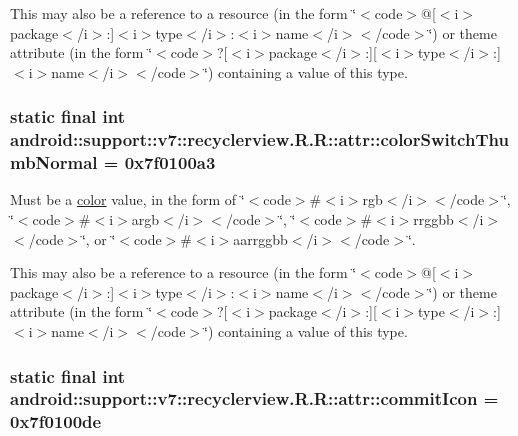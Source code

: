 This may also be a reference to a resource (in the form \char`\"{}$<$code$>$@\mbox{[}$<$i$>$package$<$/i$>$:\mbox{]}$<$i$>$type$<$/i$>$:$<$i$>$name$<$/i$>$$<$/code$>$\char`\"{}) or theme attribute (in the form \char`\"{}$<$code$>$?\mbox{[}$<$i$>$package$<$/i$>$:\mbox{]}\mbox{[}$<$i$>$type$<$/i$>$:\mbox{]}$<$i$>$name$<$/i$>$$<$/code$>$\char`\"{}) containing a value of this type. \hypertarget{classandroid_1_1support_1_1v7_1_1recyclerview_1_1_r_1_1attr_87d8c5adfd316a6c30182c5ca33fc1ab}{
\subsubsection[{colorSwitchThumbNormal}]{\setlength{\rightskip}{0pt plus 5cm}static final int android::support::v7::recyclerview.R.R::attr::colorSwitchThumbNormal = 0x7f0100a3}}
\label{classandroid_1_1support_1_1v7_1_1recyclerview_1_1_r_1_1attr_87d8c5adfd316a6c30182c5ca33fc1ab}


Must be a \hyperlink{classandroid_1_1support_1_1v7_1_1recyclerview_1_1_r_1_1color}{color} value, in the form of \char`\"{}$<$code$>$\#$<$i$>$rgb$<$/i$>$$<$/code$>$\char`\"{}, \char`\"{}$<$code$>$\#$<$i$>$argb$<$/i$>$$<$/code$>$\char`\"{}, \char`\"{}$<$code$>$\#$<$i$>$rrggbb$<$/i$>$$<$/code$>$\char`\"{}, or \char`\"{}$<$code$>$\#$<$i$>$aarrggbb$<$/i$>$$<$/code$>$\char`\"{}. 

This may also be a reference to a resource (in the form \char`\"{}$<$code$>$@\mbox{[}$<$i$>$package$<$/i$>$:\mbox{]}$<$i$>$type$<$/i$>$:$<$i$>$name$<$/i$>$$<$/code$>$\char`\"{}) or theme attribute (in the form \char`\"{}$<$code$>$?\mbox{[}$<$i$>$package$<$/i$>$:\mbox{]}\mbox{[}$<$i$>$type$<$/i$>$:\mbox{]}$<$i$>$name$<$/i$>$$<$/code$>$\char`\"{}) containing a value of this type. \hypertarget{classandroid_1_1support_1_1v7_1_1recyclerview_1_1_r_1_1attr_2e4f141299cff663f646011d5a430008}{
\subsubsection[{commitIcon}]{\setlength{\rightskip}{0pt plus 5cm}static final int android::support::v7::recyclerview.R.R::attr::commitIcon = 0x7f0100de}}
\label{classandroid_1_1support_1_1v7_1_1recyclerview_1_1_r_1_1attr_2e4f141299cff663f646011d5a430008}



